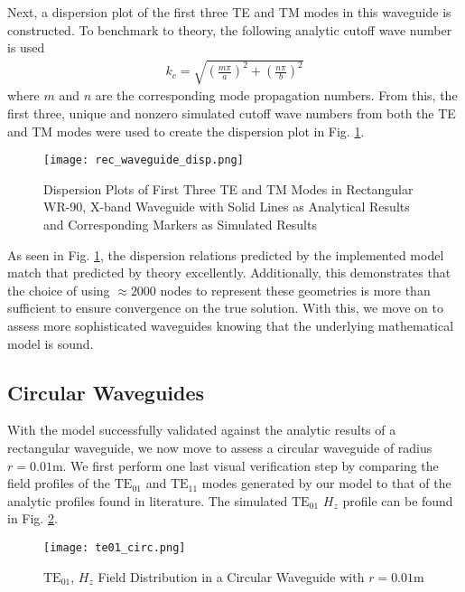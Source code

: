 Next, a dispersion plot of the first three TE and TM modes in this waveguide is constructed. To benchmark to theory, the following analytic cutoff wave number is used
\begin{align}
    k_c=\sqrt{\left(\frac{m\pi}{a}\right)^2+\left(\frac{n\pi}{b}\right)^2}
\end{align}
where $m$ and $n$ are the corresponding mode propagation numbers. From this, the first three, unique and nonzero simulated cutoff wave numbers from both the TE and TM modes were used to create the dispersion plot in Fig. \ref{fig:rect_disp}.

\begin{figure}[h!]  
	\centering
	\texttt{[image: rec\_waveguide\_disp.png]} 
	\caption{Dispersion Plots of First Three TE and TM Modes in Rectangular WR-90, X-band Waveguide with Solid Lines as Analytical Results and Corresponding Markers as Simulated Results}
	\label{fig:rect_disp}
\end{figure}

As seen in Fig. \ref{fig:rect_disp}, the dispersion relations predicted by the implemented model match that predicted by theory excellently. Additionally, this demonstrates that the choice of using $\approx2000$ nodes to represent these geometries is more than sufficient to ensure convergence on the true solution. With this, we move on to assess more sophisticated waveguides knowing that the underlying mathematical model is sound.


\subsection{Circular Waveguides}
\label{subsec:circ_guides}
With the model successfully validated against the analytic results of a rectangular waveguide, we now move to assess a circular waveguide of radius $r=0.01$m. We first perform one last visual verification step by comparing the field profiles of the $\mathrm{TE}_{01}$ and $\mathrm{TE}_{11}$ modes generated by our model to that of the analytic profiles found in literature. The simulated $\mathrm{TE}_{01}$ $H_z$ profile can be found in Fig. \ref{fig:circ_prof}.

\begin{figure}[h!]  
	\centering
	\texttt{[image: te01\_circ.png]} 
	\caption{$\mathrm{TE_{01}}$, $H_z$ Field Distribution in a Circular Waveguide with $r=0.01$m}
	\label{fig:circ_prof}
\end{figure}

